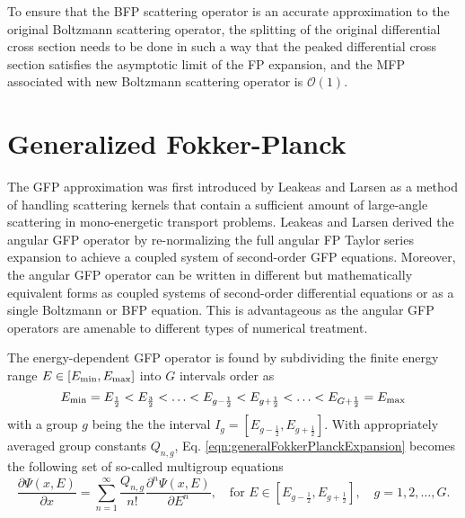 \documentclass[../main.tex]{subfiles}
\begin{document}
To ensure that the BFP scattering operator is an accurate approximation to the original Boltzmann scattering operator, the splitting of the original differential cross section needs to be done in such a way that the peaked differential cross section satisfies the asymptotic limit of the FP expansion, and the MFP associated with new Boltzmann scattering operator is $\mathcal{O}(1)$.

\section{Generalized Fokker-Planck}
The GFP approximation was first introduced by Leakeas and Larsen \cite{leakeas-2001} as a method of handling scattering kernels that contain a sufficient amount of large-angle scattering in mono-energetic transport problems. Leakeas and Larsen derived the angular GFP operator by re-normalizing the full angular FP Taylor series expansion to achieve a coupled system of second-order GFP equations. Moreover, the angular GFP operator can be written in different but mathematically equivalent forms as coupled systems of second-order differential equations or as a single Boltzmann or BFP equation. This is advantageous as the angular GFP operators are amenable to different types of numerical treatment.

The energy-dependent GFP operator is found by subdividing the finite energy range $E \in [E_{\text{min}}, E_{\text{max}}]$ into $G$ intervals order as 
\begin{equation}
  E_{\text{min}} = E_{\frac{1}{2}} < E_{\frac{3}{2}} < \ldots < E_{g-\frac{1}{2}} < E_{g+\frac{1}{2}} < \ldots < E_{G+\frac{1}{2}} = E_{\text{max}}
\end{equation}
with a group $g$ being the the interval $I_g = [E_{g-\frac{1}{2}}, E_{g+\frac{1}{2}}]$. With appropriately averaged group constants $Q_{n,g}$, Eq. \eqref{eqn:generalFokkerPlanckExpansion} becomes the following set of so-called multigroup equations
\begin{equation} \label{eqn:multigroupFokkerPlanck}
  \dfrac{\partial \Psi(x,E)}{\partial x} = \sum_{n=1}^{\infty} \dfrac{Q_{n,g}}{n !} \dfrac{\partial^n \Psi(x,E) }{\partial E^n}, \quad \text{for} \,\, E \in [E_{g-\frac{1}{2}}, E_{g+\frac{1}{2}}], \quad g = 1,2,\ldots,G.
\end{equation}
\end{document}
